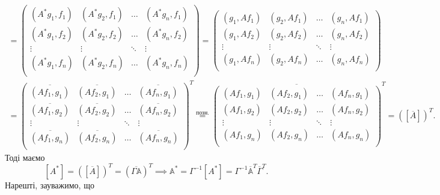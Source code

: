\documentclass{math_library}
\begin{document}
\begin{align*}
[A^*] = \begin{pmatrix}
(A^*g_1, f_1) & (A^*g_2, f_1) & \dots & (A^*g_n, f_1) \\
(A^*g_1, f_2) & (A^*g_2, f_2) & \dots & (A^*g_n, f_2) \\
\vdots & \vdots & \ddots & \vdots \\
(A^*g_1, f_n) & (A^*g_2, f_n) & \dots & (A^*g_n, f_n) \\
\end{pmatrix} =
\begin{pmatrix}
(g_1, Af_1) & (g_2, Af_1) & \dots & (g_n, Af_1) \\
(g_1, Af_2) & (g_2, Af_2) & \dots & (g_n, Af_2) \\
\vdots & \vdots & \ddots & \vdots \\
(g_1, Af_n) & (g_2, Af_n) & \dots & (g_n, Af_n) \\
\end{pmatrix} \\ =
\begin{pmatrix}
\overline{(Af_1, g_1)} & \overline{(Af_2, g_1)} & \dots & \overline{(Af_n, g_1)} \\
\overline{(Af_1, g_2)} & \overline{(Af_2, g_2)} & \dots & \overline{(Af_n, g_2)} \\
\vdots & \vdots & \ddots & \vdots \\
\overline{(Af_1, g_n)} & \overline{(Af_2, g_n)} & \dots & \overline{(Af_n, g_n)} \\
\end{pmatrix}^T \overset{\text{позн.}}{=}
\overline{\begin{pmatrix}
(Af_1, g_1) & (Af_2, g_1) & \dots & (Af_n, g_1) \\
(Af_1, g_2) & (Af_2, g_2) & \dots & (Af_n, g_2) \\
\vdots & \vdots & \ddots & \vdots \\
(Af_1, g_n) & (Af_2, g_n) & \dots & (Af_n, g_n) \\
\end{pmatrix}}^T = ([\overline{A}])^T.
\end{align*}
Тоді маємо 
\[
[A^*] = ([\overline{A}])^T = (\overline{\Gamma \mathbb{A}})^T \implies \mathbb{A}^* = \Gamma^{-1} [A^*] = \Gamma^{-1} \overline{\mathbb{A}}^T \overline{\Gamma}^T.
\]
Нарешті, зауважимо, що
\end{document}
